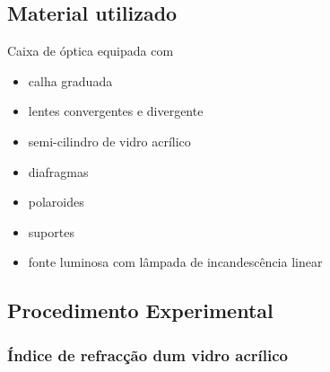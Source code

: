 \documentclass[a4paper,12pt]{article}      %
\begin{document}

\subsection{\sf Material utilizado}
Caixa de óptica equipada com
\begin{itemize}
\item calha graduada
\item lentes convergentes e divergente
\item semi-cilindro de vidro acrílico
\item diafragmas
\item polaroides
\item suportes
\item fonte luminosa com lâmpada de incandescência linear
\end{itemize}


\subsection{\sf Procedimento Experimental}

\subsubsection{\sf  Índice de refracção dum vidro acrílico }
\end{document}
